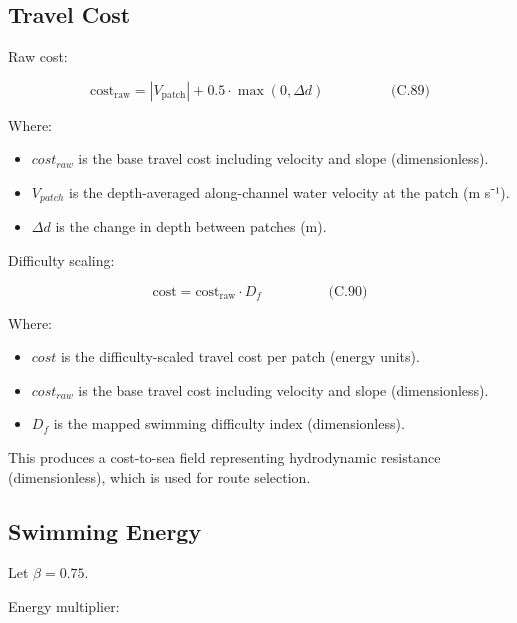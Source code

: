 \documentclass[
]{book}
\providecommand{\tightlist}{%
  \setlength{\itemsep}{0pt}\setlength{\parskip}{0pt}}
\begin{document}
\subsection{Travel Cost}\label{travel-cost-1}

Raw cost:

\[
\begin{equation} \text{cost}_{\text{raw}}
=
|V_{\text{patch}}|
+
0.5 \cdot \max(0, \Delta d)  \hspace{2cm} \text{(C.89)} \end{equation}
\]

Where:

\begin{itemize}
\tightlist
\item
  \(cost_{raw}\) is the base travel cost including velocity and slope
  (dimensionless).
\item
  \(V_{patch}\) is the depth-averaged along-channel water velocity at
  the patch (m s⁻¹).
\item
  \(\Delta d\) is the change in depth between patches (m).
\end{itemize}

Difficulty scaling:

\[
\begin{equation} \text{cost}
=
\text{cost}_{\text{raw}} \cdot D_f  \hspace{2cm} \text{(C.90)} \end{equation}
\]

Where:

\begin{itemize}
\item
  \(cost\) is the difficulty-scaled travel cost per patch (energy
  units).
\item
  \(cost_{raw}\) is the base travel cost including velocity and slope
  (dimensionless).
\item
  \(D_f\) is the mapped swimming difficulty index (dimensionless).
\end{itemize}

This produces a cost-to-sea field representing hydrodynamic resistance
(dimensionless), which is used for route selection.

\subsection{Swimming Energy}\label{swimming-energy-1}

Let \(\beta = 0.75\).

Energy multiplier:
\end{document}
